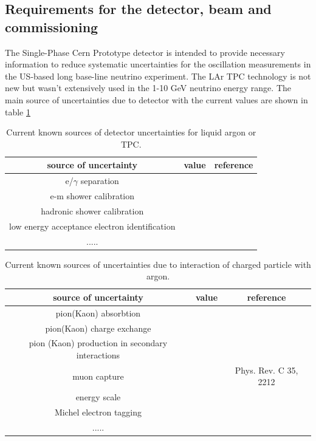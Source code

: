 \subsection{Requirements for the detector, beam and commissioning}
\label{detbeam_main}
The Single-Phase Cern Prototype detector is intended to provide necessary information to reduce systematic uncertainties for the oscillation measurements in the US-based long base-line neutrino experiment.   The LAr TPC technology is not new but wasn't extensively used in the 1-10 GeV neutrino energy range.  The main source of uncertainties due to detector with the current values are shown in table \ref{table:deterr}


\begin{table}[h]
\centering
\caption{Current known sources of detector uncertainties for liquid argon or TPC.}
\label{table:deterr}
\begin{tabular}{|c|c|c|}
\hline
\textbf{source of uncertainty } & \textbf{value} & \textbf{reference}  \\ \hline
  e/$\gamma$ separation        &           &                   \\ \hline
  e-m shower calibration        &           &            \\ \hline
   hadronic shower calibration       &           &        \\ \hline
low energy acceptance electron identification &   &  \\ \hline
 .....   &   &   \\ \hline
\end{tabular}
\end{table}



\begin{table}[h]
\centering
\caption{Current known sources of  uncertainties due to interaction of charged particle with argon.}
\label{table:physicserr}
\begin{tabular}{|c|c|c|}
\hline
\textbf{source of uncertainty } & \textbf{value} & \textbf{reference}  \\ \hline
 pion(Kaon) absorbtion       &           &                   \\ \hline
 pion(Kaon) charge exchange       &           &            \\ \hline
pion (Kaon) production in secondary interactions  &   &  \\ \hline
 muon capture       &           &  Phys. Rev. C 35, 2212      \\ \hline
energy scale  &   &   \\ \hline
Michel electron tagging  &  &  \\ \hline

 .....   &   &   \\ \hline
\end{tabular}
\end{table}



